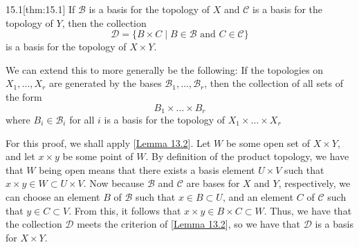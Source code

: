 \begin{thmBox}{15.1}[thm:15.1]
    If \( \mathcal{B} \) is a basis for the topology of \( X \) and 
    \( \mathcal{C} \) is a basis for the topology of \( Y \), then the
    collection
    \begin{equation*}
        \mathcal{D} 
        =
        \{ B \times C \mid B \in \mathcal{B} \text{ and } C \in \mathcal{C} \}
    \end{equation*}
    is a basis for the topology of \( X \times Y \).

    \baseSkip

    We can extend this to more generally be the following: 
    If the topologies on \( X_{ 1 } , \ldots ,  X_{ r } \) are generated by the 
    bases \( \mathcal{B}_{ 1 } , \ldots , \mathcal{B}_{ r } \), then the 
    collection of all sets of the form
    \begin{equation*}
        B_{ 1 } \times \ldots \times B_{ r }
    \end{equation*}
    where \( B_{ i } \in \mathcal{B}_{ i } \) for all \( i \) is a basis for the
    topology of \( X_{ 1 } \times \ldots \times  X_{ r } \)

    \baseRule

    \begin{proofBox}
        For this proof, we shall apply [\hyperlink{lem:13.2}{Lemma 13.2}].
        Let \( W \) be some open set of \( X \times Y \), and let 
        \( x \times y \) be some point of \( W \).
        By definition of the product topology, we have that \( W \) being 
        open means that there exists a basis element \( U \times V \) such that
        \( x \times y \in W \subset U \times V \).
        Now because \( \mathcal{B} \) and \( \mathcal{C} \) are bases for 
        \( X \) and \( Y \), respectively, we can choose an element \( B \)
        of \( \mathcal{B} \) such that \( x \in B \subset U \), and an element
        \( C \) of \( \mathcal{C} \) such that \( y \in C \subset V \).
        From this, it follows that \( x \times y \in B \times C \subset W \).
        Thus, we have that the collection \( \mathcal{D} \) meets the criterion
        of [\hyperlink{lem:13.2}{Lemma 13.2}], so we have that
        \( \mathcal{D} \) is a basis for \( X \times Y \).
    \end{proofBox}
\end{thmBox}

